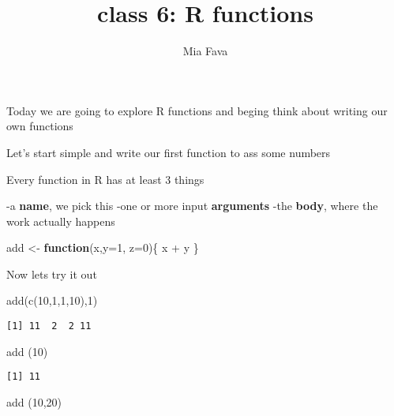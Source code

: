 \documentclass[
  letterpaper,
  DIV=11,
  numbers=noendperiod]{scrartcl}
\title{class 6: R functions}
\author{Mia Fava}
\date{}
\newenvironment{Shaded}{\begin{snugshade}}{\end{snugshade}}
\newcommand{\AttributeTok}[1]{\textcolor[rgb]{0.40,0.45,0.13}{#1}}
\newcommand{\ControlFlowTok}[1]{\textcolor[rgb]{0.00,0.23,0.31}{\textbf{#1}}}
\newcommand{\DecValTok}[1]{\textcolor[rgb]{0.68,0.00,0.00}{#1}}
\newcommand{\FunctionTok}[1]{\textcolor[rgb]{0.28,0.35,0.67}{#1}}
\newcommand{\NormalTok}[1]{\textcolor[rgb]{0.00,0.23,0.31}{#1}}
\newcommand{\OtherTok}[1]{\textcolor[rgb]{0.00,0.23,0.31}{#1}}
\newcommand{\SpecialCharTok}[1]{\textcolor[rgb]{0.37,0.37,0.37}{#1}}
\begin{document}
\maketitle


Today we are going to explore R functions and beging think about writing
our own functions

Let's start simple and write our first function to ass some numbers

Every function in R has at least 3 things

-a \textbf{name}, we pick this -one or more input \textbf{arguments}
-the \textbf{body}, where the work actually happens

\begin{Shaded}
\begin{Highlighting}[]
\NormalTok{add }\OtherTok{\textless{}{-}} \ControlFlowTok{function}\NormalTok{(x,}\AttributeTok{y=}\DecValTok{1}\NormalTok{, }\AttributeTok{z=}\DecValTok{0}\NormalTok{)\{}
\NormalTok{  x }\SpecialCharTok{+}\NormalTok{ y }
\NormalTok{\}}
\end{Highlighting}
\end{Shaded}

Now lets try it out

\begin{Shaded}
\begin{Highlighting}[]
\FunctionTok{add}\NormalTok{(}\FunctionTok{c}\NormalTok{(}\DecValTok{10}\NormalTok{,}\DecValTok{1}\NormalTok{,}\DecValTok{1}\NormalTok{,}\DecValTok{10}\NormalTok{),}\DecValTok{1}\NormalTok{)}
\end{Highlighting}
\end{Shaded}

\begin{verbatim}
[1] 11  2  2 11
\end{verbatim}

\begin{Shaded}
\begin{Highlighting}[]
\FunctionTok{add}\NormalTok{ (}\DecValTok{10}\NormalTok{)}
\end{Highlighting}
\end{Shaded}

\begin{verbatim}
[1] 11
\end{verbatim}

\begin{Shaded}
\begin{Highlighting}[]
\FunctionTok{add}\NormalTok{ (}\DecValTok{10}\NormalTok{,}\DecValTok{20}\NormalTok{)}
\end{Highlighting}
\end{Shaded}
\end{document}

